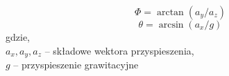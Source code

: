 {{        \begin{equation}\label{pitch_eqtn}
            \Phi = \arctan( a_y / a_z)
        \end{equation}
        \begin{equation}\label{roll_eqtn}
            \theta = \arcsin( a_x / g)
        \end{equation}
        gdzie,\\
        $a_x,a_y,a_z$ -- składowe wektora przyspieszenia,\\
        $g$ -- przyspieszenie grawitacyjne
        
    }
}